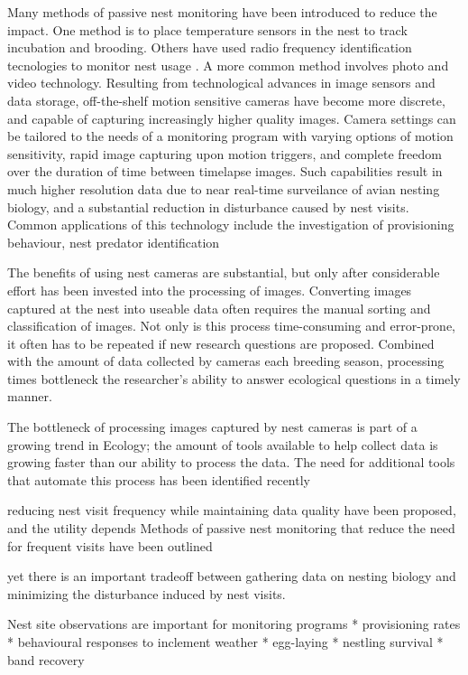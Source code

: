 Many methods of passive nest monitoring have been introduced to reduce the impact.
One method is to place temperature sensors in the nest to track incubation and brooding.
Others have used radio frequency identification tecnologies to monitor nest usage \cite{alba2019ZB}.
A more common method involves photo and video technology.
Resulting from technological advances in image sensors and data storage, off-the-shelf motion sensitive cameras have become more discrete, and capable of capturing increasingly higher quality images.
Camera settings can be tailored to the needs of a monitoring program with varying options of motion sensitivity, rapid image capturing upon motion triggers, and complete freedom over the duration of time between timelapse images. 
Such capabilities result in much higher resolution data due to near real-time surveilance of avian nesting biology, and a substantial reduction in disturbance caused by nest visits.
Common applications of this technology include the investigation of provisioning behaviour, nest predator identification \cite{cox2012LE,degregorio2014EE}

 
 
 
 
The benefits of using nest cameras are substantial, but only after considerable effort has been invested into the processing of images.
Converting images captured at the nest into useable data often requires the manual sorting and classification of images.
Not only is this process time-consuming and error-prone, it often has to be repeated if new research questions are proposed.
Combined with the amount of data collected by cameras each breeding season, processing times bottleneck the researcher's ability to answer ecological questions in a timely manner.

 
 
 
 
The bottleneck of processing images captured by nest cameras is part of a growing trend in Ecology; the amount of tools available to help collect data is growing faster than our ability to process the data. 
The need for additional tools that automate this process has been identified recently

reducing nest visit frequency while maintaining data quality have been proposed, and the utility depends Methods of passive nest monitoring that reduce the need for frequent visits have been outlined


yet there is an important tradeoff between gathering data on nesting biology and minimizing the disturbance induced by nest visits.

Nest site observations are important for monitoring programs
* provisioning rates
* behavioural responses to inclement weather
* egg-laying
* nestling survival
* band recovery


 

 
 






